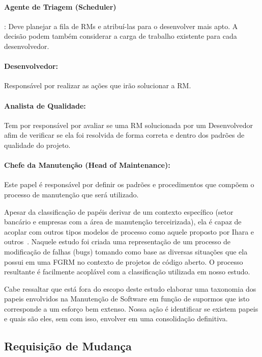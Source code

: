 \paragraph{Agente de Triagem (Scheduler)}:
Deve planejar a fila de RMs e atribuí-las para o desenvolver mais apto. A decisão
podem também considerar a carga de trabalho existente para cada desenvolvedor.

\paragraph{Desenvolvedor:}
Responsável por realizar as ações que irão solucionar a RM\@.

\paragraph{Analista de Qualidade:}
Tem por responsável por avaliar se uma RM solucionada por um Desenvolvedor afim
de verificar se ela foi resolvida de forma correta e dentro dos padrões de
qualidade do projeto.

\paragraph{Chefe da Manutenção (Head of	Maintenance):}
Este papel é responsável por definir os padrões e procedimentos que compõem o
processo de manutenção que será utilizado.

Apesar da classificação de papéis derivar de um contexto específico (setor
bancário e empresas com a área de manutenção terceirizada), ela é capaz de
acoplar com outros tipos modelos de processo como aquele proposto por Ihara e
outros~\cite{Ihara:2009:AMI:1595808.1595833}. Naquele estudo foi criada uma
representação de um processo de modificação de falhas (bugs) tomando como base
as diversas situações que ela possui em uma FGRM no contexto de projetos de
código aberto. O processo resultante é facilmente acoplável com a classificação
utilizada em nosso estudo.

Cabe ressaltar que está fora do escopo deste estudo elaborar uma taxonomia dos
papeis envolvidos na Manutenção de Software em função de supormos que isto
corresponde a um esforço bem extenso. Nossa ação é identificar se existem papeis
e quais são eles, sem com isso, envolver em uma consolidação definitiva.

\subsection{Requisição de Mudança}
\label{sec:requisicao_de_mudanca}

